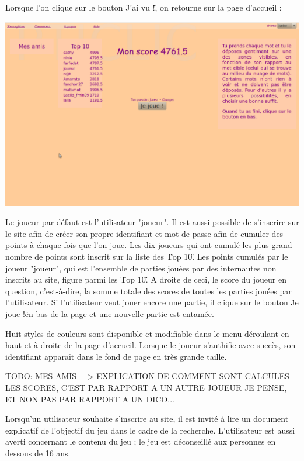 \documentclass[a4paper,11pt,french]{article}
\begin{document}
Lorsque l'on clique sur le bouton \"J'ai vu !\", on retourne sur la page d'accueil :

\begin{center}
\includegraphics[width=14cm]{img/PtiClicAccueil.png}
\end{center}

Le joueur par défaut est l'utilisateur "joueur". Il est aussi possible de s'inscrire sur le site afin de créer son propre identifiant et mot de passe afin de cumuler des points à chaque fois que l'on joue. Les dix joueurs qui ont cumulé les plus grand nombre de points sont inscrit sur la liste des \"Top 10\". Les points cumulés par le joueur "joueur", qui est l'ensemble de parties jouées par des internautes non inscrits au site, figure parmi les \"Top 10\". A droite de ceci, le score du joueur en question, c'est-à-dire, la somme totale des scores de toutes les parties jouées par l'utilisateur. Si l'utilisateur veut jouer encore une partie, il clique sur le bouton \"Je joue !\" en bas de la page et une nouvelle partie est entamée.

Huit styles de couleurs sont disponible et modifiable dans le menu déroulant en haut et à droite de la page d'accueil. Lorsque le joueur s'authifie avec succès, son identifiant apparaît dans le fond de page en très grande taille.

TODO: MES AMIS ---> EXPLICATION DE COMMENT SONT CALCULES LES SCORES, C'EST PAR RAPPORT A UN AUTRE JOUEUR JE PENSE, ET NON PAS PAR RAPPORT A UN DICO... 

Lorsqu'un utilisateur souhaite s'inscrire au site, il est invité à lire un document explicatif de l'objectif du jeu dans le cadre de la recherche. L'utilisateur est aussi averti concernant le contenu du jeu ; le jeu est déconseillé aux personnes en dessous de 16 ans.
\end{document}
